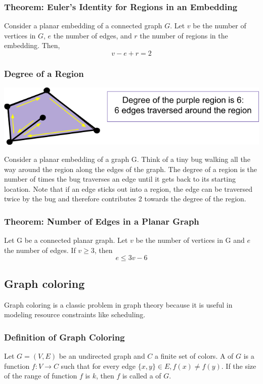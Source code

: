 \subsubsection*{Theorem: Euler's Identity for Regions in an Embedding}
Consider a planar embedding of a connected graph $G$. Let $v$ be the number of vertices in $G$, $e$ the number of edges, and $r$ the number of regions in the embedding. Then,
\[
  v - e + r = 2
\]

\subsubsection*{Degree of a Region}
\begin{center}
  \includegraphics[width=0.6\linewidth]{resources/degree of a region.png}
\end{center}
Consider a planar embedding of a graph G. Think of a tiny bug walking all the way around the region along the edges of the graph. The degree of a region is the number of times the bug traverses an edge until it gets back to its starting location. Note that if an edge sticks out into a region, the edge can be traversed twice by the bug and therefore contributes 2 towards the degree of the region.

\subsubsection*{Theorem: Number of Edges in a Planar Graph}
Let G be a connected planar graph. Let $v$ be the number of vertices in G and $e$ the number of edges. If $v \geq 3$, then
\[
  e \leq 3v-6
\]

\subsection{Graph coloring}
Graph coloring is a classic problem in graph theory because it is useful in modeling resource constraints like scheduling.

\subsubsection*{Definition of Graph Coloring}
Let $G=(V,E)$ be an undirected graph and $C$ a finite set of colors. A  of $G$ is a function $f: V \rightarrow C$ such that for every edge $\{x,y\} \in E, f(x) \neq f(y)$. If the size of the range of function $f$ is $k$, then $f$ is called a  of $G$.

